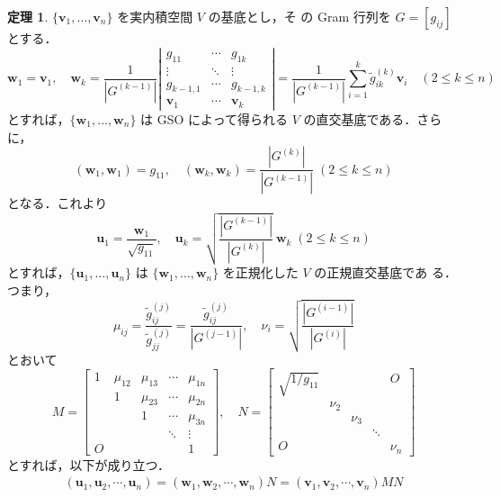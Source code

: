 \documentclass[11pt, uplatex, dvipdfmx]{jsarticle}
\theoremstyle{definition}
\newtheorem{theorem}{定理}[section]
\begin{document}
\begin{theorem}\label{thm:formula}
  $\{\bm{v}_1, \ldots, \bm{v}_n\}$ を実内積空間 $V$ の基底とし，そ
  の Gram 行列を $G=\left[ g_{ij}\right]$ とする．
  \[
    \bm{w}_1= \bm{v}_1, \quad \bm{w}_k =
    \frac{1}{\left|G^{(k-1)}\right|}\left|
      \begin{array}{ccc}
        g_{11} & \cdots & g_{1k}\\
        \vdots & \ddots & \vdots\\
        g_{k-1,1} & \cdots & g_{k-1, k}\\
        \bm{v}_1 & \cdots & \bm{v}_k
      \end{array}
    \right| =  \frac{1}{\left|G^{(k-1)}\right|} \sum_{i=1}^{k}
    \tilde{g}^{(k)}_{ik} \bm{v}_i \quad ( 2 \leq k \leq n)
  \]
  とすれば，$\{\bm{w}_1, \ldots, \bm{w}_n\}$ は GSO によって得られる $V$ の直交基底である．さらに，
  \[
    (\bm{w}_1, \bm{w}_1) = g_{11}, \quad (\bm{w}_k, \bm{w}_k) =
    \frac{\left| G^{(k)}\right|}{\left|G^{(k-1)}\right|} \; (2 \leq k \leq n)
  \]
  となる．これより
  \[
    \bm{u}_1 = \frac{\bm{w}_1}{\sqrt{g_{11}}}, \quad \bm{u}_k =
    \sqrt{\frac{\left|G^{(k-1)}\right|}{\left|G^{(k)}\right|}}~
    \bm{w}_k \; (2 \leq k \leq n)
  \]
  とすれば，$\{\bm{u}_1, \ldots, \bm{u}_n\}$ は
  $\{\bm{w}_1, \ldots, \bm{w}_n\}$ を正規化した $V$ の正規直交基底であ
  る．つまり，
  \[
    \mu_{ij} = \frac{\tilde{g}^{(j)}_{ij}}{\tilde{g}^{(j)}_{jj}}
    = \frac{\tilde{g}^{(j)}_{ij}}{\left|G^{(j-1)}\right|}, \quad
    \nu_{i} = \sqrt{\frac{\left|G^{(i-1)}\right|}{\left|G^{(i)}\right|}}
  \]
  とおいて
  \[
    M = \left[
      \begin{array}{ccccc}
        1 & \mu_{12} & \mu_{13} & \cdots & \mu_{1n}\\
         & 1 & \mu_{23} & \cdots & \mu_{2n}\\
         &  & 1 & \cdots & \mu_{3n}\\
         &  &  & \ddots & \vdots\\
        O &  &  &  & 1
      \end{array}
    \right], \quad N= \left[
      \begin{array}{ccccc}
        \sqrt{1/g_{11}} & & & & O\\
                        & \nu_{2} & & & \\
                        & & \nu_{3} & &\\
                        & && \ddots & \\
        O & & &&  \nu_{n}
      \end{array}
    \right]
  \]
  とすれば，以下が成り立つ．
  \[
    \begin{aligned}
      \left(\bm{u}_1, \bm{u}_2, \cdots, \bm{u}_n\right) = \left(\bm{w}_1, \bm{w}_2, \cdots, \bm{w}_n\right) N=
    \left( \bm{v}_1 , \bm{v}_2, \cdots, \bm{v}_n\right)MN
  \end{aligned}
  \]
\end{theorem}
\end{document}
